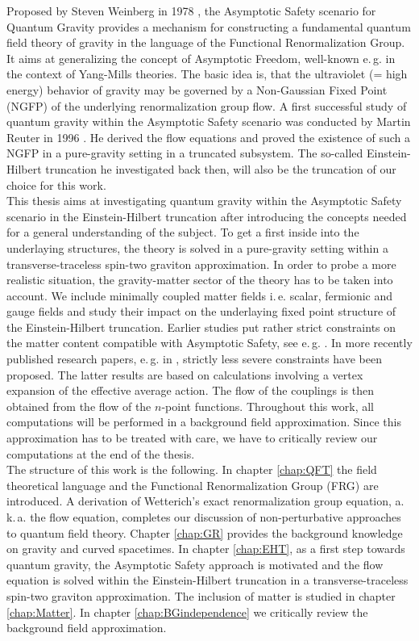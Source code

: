 Proposed by Steven Weinberg in 1978 \cite{Weinberg1980}, the Asymptotic Safety scenario for Quantum Gravity provides a mechanism for constructing a fundamental quantum field theory of gravity in the language of the Functional Renormalization Group. It aims at generalizing the concept of Asymptotic Freedom, well-known e.\,g. in the context of Yang-Mills theories. The basic idea is, that the ultraviolet (= high energy) behavior of gravity may be governed by a Non-Gaussian Fixed Point (NGFP) of the underlying renormalization group flow. A first successful study of quantum gravity within the Asymptotic Safety scenario was conducted by Martin Reuter in 1996 \cite{Reuter1996}. He derived the flow equations and proved the existence of such a NGFP in a pure-gravity setting in a truncated subsystem. The so-called Einstein-Hilbert truncation he investigated back then, will also be the truncation of our choice for this work. \\
This thesis aims at investigating quantum gravity within the Asymptotic Safety scenario in the Einstein-Hilbert truncation after introducing the concepts needed for a general understanding of the subject. To get a first inside into the underlaying structures, the theory is solved in a pure-gravity setting within a transverse-traceless spin-two graviton approximation. In order to probe a more realistic situation, the gravity-matter sector of the theory has to be taken into account. We include minimally coupled matter fields i.\,e. scalar, fermionic and gauge fields and study their impact on the underlaying fixed point structure of the Einstein-Hilbert truncation. Earlier studies put rather strict constraints on the matter content compatible with Asymptotic Safety, see e.\,g. \cite{DonaEichhornPercacci2013}. In more recently published  research papers, e.\,g. in \cite{MeibohmPawlowskiReichert2015, ChristiansenLitimPawlowskiReichert2018}, strictly less severe constraints have been proposed. The latter results are based on calculations involving a vertex expansion of the effective average action. The flow of the couplings is then obtained from the flow of the $n$-point functions.
 Throughout this work, all computations will be performed in a background field approximation. Since this approximation has to be treated with care, we have to critically review our computations at the end of the thesis. \\
The structure of this work is the following. In chapter \ref{chap:QFT} the field theoretical language and the Functional Renormalization Group (FRG) are introduced. A derivation of Wetterich's exact renormalization group equation, a.\,k.\,a. the flow equation,  completes our discussion of non-perturbative approaches to quantum field theory. Chapter \ref{chap:GR} provides the background knowledge on gravity and curved spacetimes. In chapter \ref{chap:EHT}, as a first step towards quantum gravity, the Asymptotic Safety approach is motivated and the flow equation is solved within the Einstein-Hilbert truncation in a transverse-traceless spin-two graviton approximation. The inclusion of matter is studied in chapter \ref{chap:Matter}. In chapter \ref{chap:BGindependence} we critically review the background field approximation.
